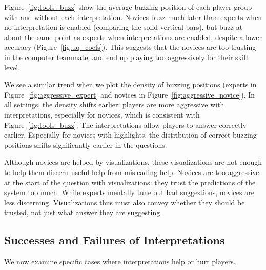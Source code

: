 Figure~\ref{fig:tools_buzz} show the
average buzzing position of each player group with and without each
interpretation.
Novices buzz much later than experts when no interpretation is enabled
(comparing the solid vertical bars), but buzz at about the same point
as experts when interpretations are enabled, despite a lower accuracy
(Figure~\ref{fig:uq_coefs}). This suggests that the novices are too
trusting in the computer teammate, and end up playing too aggressively
for their skill level.

We see a similar trend when we plot the density 
of buzzing positions (experts in Figure~\ref{fig:aggressive_expert}
and novices in Figure~\ref{fig:aggressive_novice}). In all settings,
the density shifts earlier: players are more aggressive with
interpretations, especially for novices, which is consistent with
Figure~\ref{fig:tools_buzz}. The interpretations allow players to
answer correctly earlier. Especially for novices with
highlights, the distribution of correct buzzing positions shifts
significantly earlier in the questions.

Although novices are helped by visualizations, these visualizations
are not enough to help them discern useful help from misleading help.
Novices are too aggressive at the start of the question with
visualizations: they trust the predictions of the system too much.
While experts mentally tune out bad suggestions, novices
are less discerning.  Visualizations thus 
must also convey whether they should be trusted, not just what answer
they are suggesting.

\subsection{Successes and Failures of Interpretations}

We now examine specific cases where interpretations help or hurt
players.

